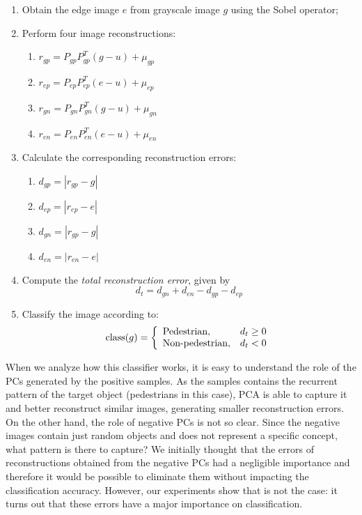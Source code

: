\documentclass[10pt, conference, compsocconf]{IEEEtran}
\begin{document}
\begin{enumerate}
  \item Obtain the edge image $e$ from grayscale image $g$ using the Sobel operator;
  \item Perform four image reconstructions:
    \begin{enumerate}
      \item $r_{gp} = P_{gp} P_{gp}^T(g-u) + \mu_{gp}$
      \item $r_{ep} = P_{ep} P_{ep}^T(e-u) + \mu_{ep}$
      \item $r_{gn} = P_{gn} P_{gn}^T(g-u) + \mu_{gn}$
      \item $r_{en} = P_{en} P_{en}^T(e-u) + \mu_{en}$
    \end{enumerate}
  \item Calculate the corresponding reconstruction errors:
    \begin{enumerate}
      \item $d_{gp} = |r_{gp} - g|$
      \item $d_{ep} = |r_{ep} - e|$
      \item $d_{gn} = |r_{gp} - g|$
      \item $d_{en} = |r_{en} - e|$
    \end{enumerate}
  \item Compute the \emph{total reconstruction error}, given by
    \begin{equation}
      d_t = d_{gn} + d_{en} - d_{gp} - d_{ep}
      \label{total_error}
    \end{equation}
  \item Classify the image according to:
    \begin{equation}
      \textrm{class}(g) = \left\{
        \begin{array}{l l}
         \textrm{Pedestrian}, & d_t \geq 0\\
         \textrm{Non-pedestrian}, & d_t < 0
				 \label{classification_score}
        \end{array}
      \right.
    \end{equation}
  
\end{enumerate}

When we analyze how this classifier works, it is easy to understand the role of the PCs generated by the positive samples. As the samples contains the recurrent pattern of the target object (pedestrians in this case), PCA is able to capture it and better reconstruct similar images, generating smaller reconstruction errors. On the other hand, the role of negative PCs is not so clear. Since the negative images contain just random objects and does not represent a specific concept, what pattern is there to capture? We initially thought that the errors of reconstructions obtained from the negative PCs had a negligible importance and therefore it would be possible to eliminate them without impacting the classification accuracy. However, our experiments show that is not the case: it turns out that these errors have a major importance on classification.
\end{document}

